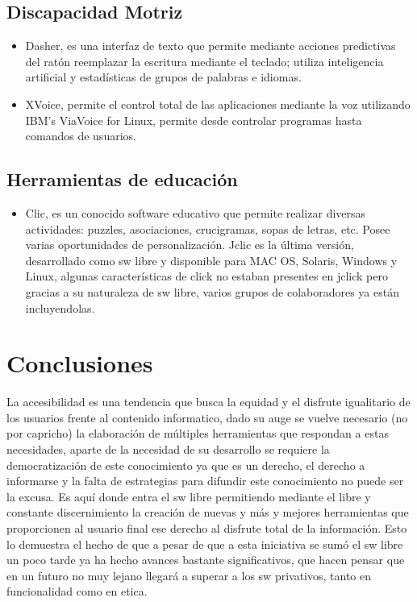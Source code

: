 \documentclass[a4paper]{article}
\begin{document}
\subsection{Discapacidad Motriz}
\begin{itemize}
\item Dasher, es una interfaz de texto que permite mediante acciones predictivas del ratón reemplazar la escritura mediante el teclado; utiliza inteligencia artificial y estadísticas de grupos de palabras e idiomas.
\item XVoice, permite el control total de las aplicaciones mediante la voz utilizando IBM's ViaVoice for Linux, permite desde controlar programas hasta comandos de usuarios.
\end{itemize}

\subsection{Herramientas de educación}
\begin{itemize}
\item Clic, es un conocido software educativo que permite realizar diversas actividades: puzzles, asociaciones, crucigramas, sopas de letras, etc. Posee varias oportunidades de personalización. Jclic es la última versión, desarrollado como sw libre y disponible para MAC OS, Solaris, Windows y Linux, algunas características de click no estaban presentes en jclick pero gracias a su naturaleza de sw libre, varios grupos de colaboradores ya están incluyendolas.
\end{itemize}

\section{Conclusiones}
La accesibilidad es una tendencia que busca la equidad y el disfrute igualitario de los usuarios frente al contenido informatico, dado su auge se vuelve necesario (no por capricho) la elaboración de múltiples herramientas que respondan a estas necesidades, aparte de la necesidad de su desarrollo se requiere la democratización de este conocimiento ya que es un derecho, el derecho a informarse y la falta de estrategias para difundir este conocimiento no puede ser la excusa. Es aquí donde entra el sw libre permitiendo mediante el libre y constante discernimiento la creación de nuevas y más y mejores herramientas que proporcionen al usuario final ese derecho al disfrute total de la información. Esto lo demuestra el hecho de que a pesar de que a esta iniciativa se sumó el sw libre un poco tarde ya ha hecho avances bastante significativos, que hacen pensar que en un futuro no muy lejano llegará a superar a los sw privativos, tanto en funcionalidad como en etica.
\end{document}

